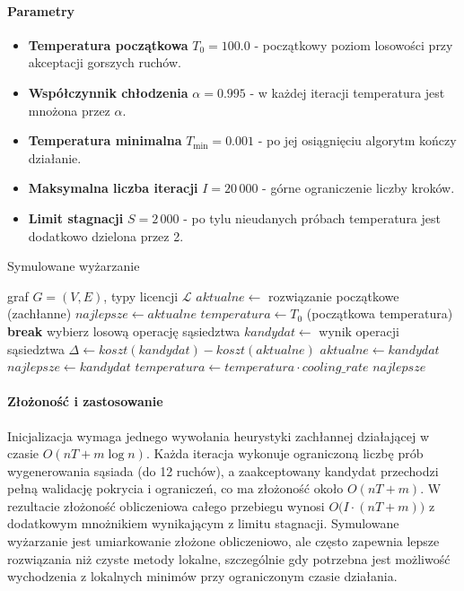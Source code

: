 \paragraph{Parametry}
\begin{itemize}
  \item \textbf{Temperatura początkowa} $T_0 = 100.0$ - początkowy poziom losowości przy akceptacji gorszych ruchów.
  \item \textbf{Współczynnik chłodzenia} $\alpha = 0.995$ - w każdej iteracji temperatura jest mnożona przez $\alpha$.
  \item \textbf{Temperatura minimalna} $T_{\min} = 0.001$ - po jej osiągnięciu algorytm kończy działanie.
  \item \textbf{Maksymalna liczba iteracji} $I = 20\,000$ - górne ograniczenie liczby kroków.
  \item \textbf{Limit stagnacji} $S = 2\,000$ - po tylu nieudanych próbach temperatura jest dodatkowo dzielona przez 2.
\end{itemize}

\begin{algorithm}[H]
  \caption{Symulowane wyżarzanie}
  \label{alg:sa}
  \begin{algorithmic}[1]
    \Require graf $G=(V,E)$, typy licencji $\mathcal{L}$
    \State $aktualne \gets$ rozwiązanie początkowe (zachłanne)
    \State $najlepsze \gets aktualne$
    \State $temperatura \gets T_0$ (początkowa temperatura)
     \textbf{break} \EndIf
    \State wybierz losową operację sąsiedztwa
    \State $kandydat \gets$ wynik operacji sąsiedztwa
    \State $\Delta \gets koszt(kandydat) - koszt(aktualne)$
    \State $aktualne \gets kandydat$
    \State $najlepsze \gets kandydat$
    \EndIf
    \EndIf
    \State $temperatura \gets temperatura \cdot cooling\_rate$
    \EndFor
    \State \Return $najlepsze$
  \end{algorithmic}
\end{algorithm}

\paragraph{Złożoność i zastosowanie}
Inicjalizacja wymaga jednego wywołania heurystyki zachłannej działającej w czasie $O(nT + m\log n)$. Każda iteracja wykonuje ograniczoną liczbę prób wygenerowania sąsiada (do 12 ruchów), a zaakceptowany kandydat przechodzi pełną walidację pokrycia i ograniczeń, co ma złożoność około $O(nT + m)$. W rezultacie złożoność obliczeniowa całego przebiegu wynosi $O\bigl(I \cdot (nT + m)\bigr)$ z dodatkowym mnożnikiem wynikającym z limitu stagnacji. Symulowane wyżarzanie jest umiarkowanie złożone obliczeniowo, ale często zapewnia lepsze rozwiązania niż czyste metody lokalne, szczególnie gdy potrzebna jest możliwość wychodzenia z lokalnych minimów przy ograniczonym czasie działania.

